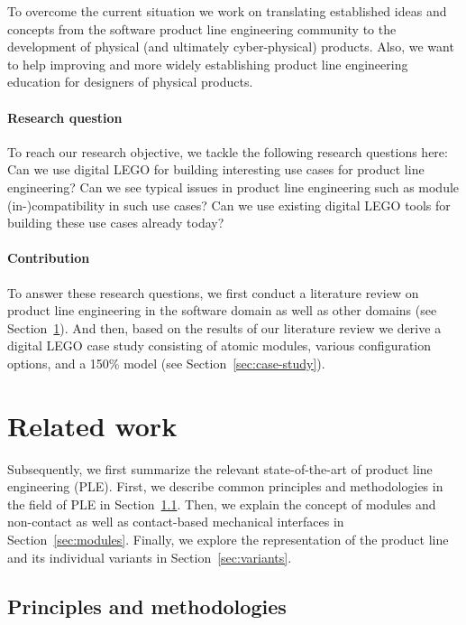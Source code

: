 \documentclass[sigconf,review]{acmart}
\begin{document}
To overcome the current situation we work on translating established ideas and concepts from the software product line engineering community to the development of physical (and ultimately cyber-physical) products.
Also, we want to help improving and more widely establishing product line engineering education for designers of physical products.

\paragraph{Research question}

To reach our research objective, we tackle the following research questions here:
Can we use digital LEGO for building interesting use cases for product line engineering?
Can we see typical issues in product line engineering such as module (in-)compatibility in such use cases?
Can we use existing digital LEGO tools for building these use cases already today?

\paragraph{Contribution}

To answer these research questions, we first conduct a literature review on product line engineering in the software domain as well as other domains (see Section~\ref{sec:related-work}).
And then, based on the results of our literature review we derive a digital LEGO case study consisting of atomic modules, various configuration options, and a 150\% model (see Section~\ref{sec:case-study}).

\section{Related work}
\label{sec:related-work}

Subsequently, we first summarize the relevant state-of-the-art of product line engineering (PLE).
First, we describe common principles and methodologies in the field of PLE in Section~\ref{sec:principles}.
Then, we explain the concept of modules and non-contact as well as contact-based mechanical interfaces in Section~\ref{sec:modules}.
Finally, we explore the representation of the product line and its individual variants in Section~\ref{sec:variants}.

\subsection{Principles and methodologies}
\label{sec:principles}
\end{document}
